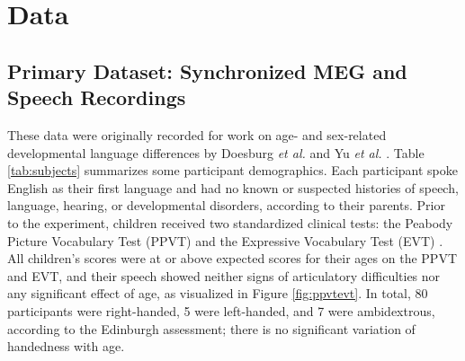 \documentclass[utf8]{frontiersSCNS} %
\begin{document}



\section{Data}

\subsection{Primary Dataset: Synchronized MEG and Speech Recordings}

These data were originally recorded for work on age- and sex-related developmental language differences by Doesburg \emph{et al.} and Yu \emph{et al.} \cite{Doesburg2016, Yu2014}. Table \ref{tab:subjects} summarizes some participant demographics. Each participant spoke English as their first language and had no known or suspected histories of speech, language, hearing, or developmental disorders, according to their parents. Prior to the experiment, children received two standardized clinical tests: the Peabody Picture Vocabulary Test (PPVT) \cite{Dunn97} and the Expressive Vocabulary Test (EVT) \cite{EVT}. All children's scores were at or above expected scores for their ages on the PPVT and EVT, and their speech showed neither signs of articulatory difficulties nor any significant effect of age, as visualized in Figure \ref{fig:ppvtevt}. In total, 80 participants were right-handed, 5 were left-handed, and 7 were ambidextrous, according to the Edinburgh assessment; there is no significant variation of handedness with age.
\end{document}

